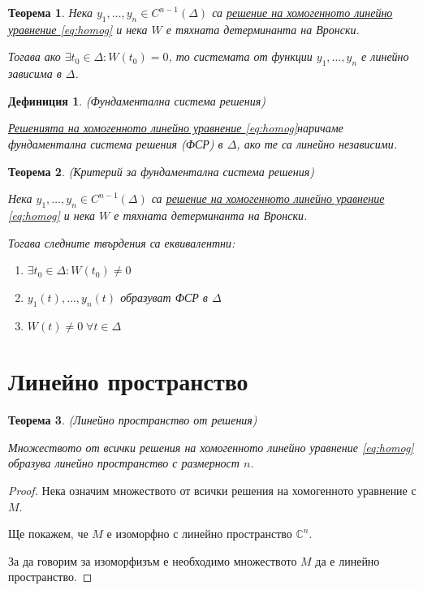 \documentclass{scrartcl}
\newtheorem{theorem}{Теорема}
\newtheorem{definition}{Дефиниция}
\begin{document}
\begin{FlushLeft}
\begin{theorem}
Нека $y_1, \dots, y_n \in C^{n-1}(\Delta)$ са \underline{решение на хомогенното линейно уравнение \eqref{eq:homog}} и нека $W$ е тяхната детерминанта на Вронски.

Тогава ако $\exists t_0 \in \Delta : W(t_0) = 0$, то системата от функции $y_1, \dots, y_n$ е линейно зависима в $\Delta$.
\end{theorem}

\begin{definition}
(Фундаментална система решения)

\underline{Решенията на хомогенното линейно уравнение \eqref{eq:homog}}наричаме фундаментална система решения (ФСР) в $\Delta$, ако те са линейно независими.
\end{definition}

\begin{theorem}
(Критерий за фундаментална система решения)

Нека $y_1, \dots, y_n \in C^{n-1}(\Delta)$ са \underline{решение на хомогенното линейно уравнение \eqref{eq:homog}} и нека $W$ е тяхната детерминанта на Вронски.

Тогава следните твърдения са еквивалентни:

\begin{enumerate}
    \item $\exists t_0 \in \Delta : W(t_0) \ne 0$
    \item $y_1(t), \dots, y_n(t)$ образуват ФСР в $\Delta$
    \item $W(t) \ne 0 \; \forall t \in \Delta$
\end{enumerate}
\end{theorem}

\section{Линейно пространство}

\begin{theorem}
(Линейно пространство от решения)

Множеството от всички решения на хомогенното линейно уравнение \eqref{eq:homog} образува линейно пространство с размерност $n$.
\end{theorem}

\begin{proof}
Нека означим множеството от всички решения на хомогенното уравнение с $M$.

Ще покажем, че $M$ е изоморфно с линейно пространство $\mathbb{C}^n$.

За да говорим за изоморфизъм е необходимо множеството $M$ да е линейно пространство.


\end{proof}
\end{FlushLeft}
\end{document}
